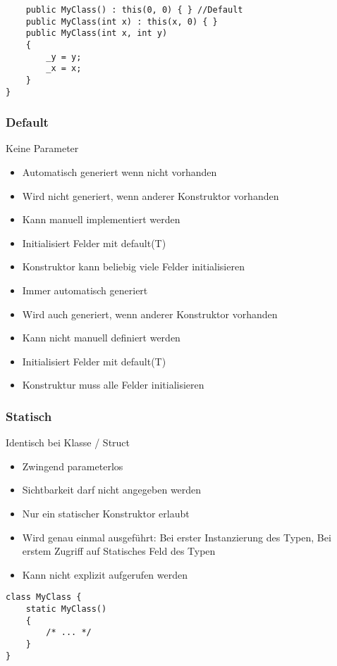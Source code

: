 \begin{multicols*}{2}
\begin{lstlisting}
    public MyClass() : this(0, 0) { } //Default
    public MyClass(int x) : this(x, 0) { }
    public MyClass(int x, int y)
    {
        _y = y; 
        _x = x;
    } 
}
\end{lstlisting}
\subsubsection{Default}
Keine Parameter
\begin{multicols*}{2}
    \begin{itemize}
        \item Automatisch generiert wenn nicht vorhanden
        \item Wird nicht generiert, wenn anderer Konstruktor vorhanden
        \item Kann manuell implementiert werden
        \item Initialisiert Felder mit default(T)
        \item Konstruktor kann beliebig viele Felder initialisieren
    \end{itemize}
    \columnbreak
    \begin{itemize}
        \item Immer automatisch generiert
        \item Wird auch generiert, wenn anderer Konstruktor vorhanden
        \item Kann nicht manuell definiert werden
        \item Initialisiert Felder mit default(T)
        \item Konstruktur muss alle Felder initialisieren
    \end{itemize}
\end{multicols*}

\subsubsection{Statisch}
Identisch bei Klasse / Struct
\begin{itemize}
    \item Zwingend parameterlos
    \item Sichtbarkeit darf nicht angegeben werden
    \item Nur ein statischer Konstruktor erlaubt
    \item Wird genau einmal ausgeführt: Bei erster Instanzierung des Typen, Bei erstem Zugriff auf Statisches Feld des Typen
    \item Kann nicht explizit aufgerufen werden
\end{itemize}
\begin{lstlisting}
class MyClass {
    static MyClass()
    {
        /* ... */
    }
}
\end{lstlisting}

\end{multicols*}
